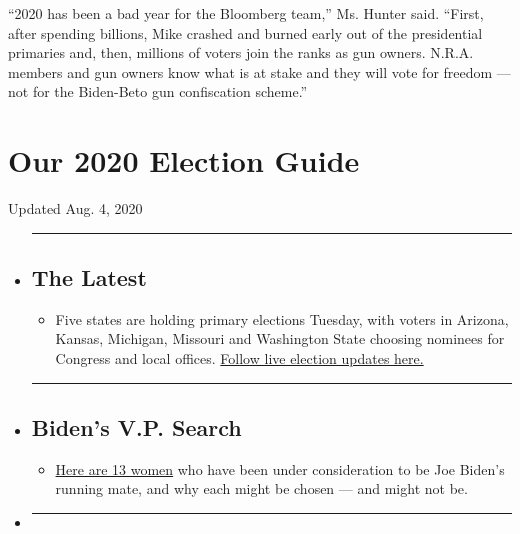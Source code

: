 ``2020 has been a bad year for the Bloomberg team,'' Ms. Hunter said.
``First, after spending billions, Mike crashed and burned early out of
the presidential primaries and, then, millions of voters join the ranks
as gun owners. N.R.A. members and gun owners know what is at stake and
they will vote for freedom --- not for the Biden-Beto gun confiscation
scheme.''

\hypertarget{our-2020-election-guide}{%
\section{Our 2020 Election Guide}\label{our-2020-election-guide}}

Updated Aug. 4, 2020

\begin{itemize}
\item
  \begin{center}\rule{0.5\linewidth}{\linethickness}\end{center}

  \hypertarget{the-latest}{%
  \subsection{The Latest}\label{the-latest}}

  \begin{itemize}
  \tightlist
  \item
    Five states are holding primary elections Tuesday, with voters in
    Arizona, Kansas, Michigan, Missouri and Washington State choosing
    nominees for Congress and local offices.
    \href{https://www.nytimes3xbfgragh.onion/2020/08/04/us/elections/primary-election-michigan-arizona-kansas.html?action=click\&pgtype=Article\&state=default\&region=BELOW_MAIN_CONTENT\&context=storylines_guide}{Follow
    live election updates here.}
  \end{itemize}
\item
  \begin{center}\rule{0.5\linewidth}{\linethickness}\end{center}

  \hypertarget{bidens-vp-search}{%
  \subsection{Biden's V.P. Search}\label{bidens-vp-search}}

  \begin{itemize}
  \tightlist
  \item
    \href{https://www.nytimes3xbfgragh.onion/article/biden-vice-president-2020.html?action=click\&pgtype=Article\&state=default\&region=BELOW_MAIN_CONTENT\&context=storylines_guide}{Here
    are 13 women} who have been under consideration to be Joe Biden's
    running mate, and why each might be chosen --- and might not be.
  \end{itemize}
\item
  \begin{center}\rule{0.5\linewidth}{\linethickness}\end{center}


\end{itemize}

